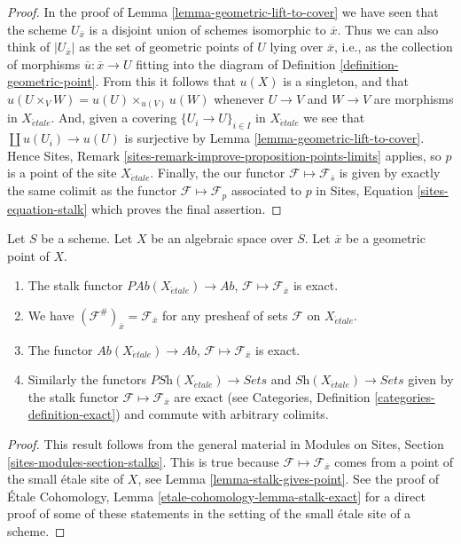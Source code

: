 \begin{proof}
In the proof of
Lemma \ref{lemma-geometric-lift-to-cover}
we have seen that the scheme $U_{\overline{x}}$ is a disjoint union of
schemes isomorphic to $\overline{x}$. Thus we can also think of
$|U_{\overline{x}}|$ as the set of geometric points of $U$ lying over
$\overline{x}$, i.e., as the collection of morphisms
$\overline{u} : \overline{x} \to U$ fitting into the diagram of
Definition \ref{definition-geometric-point}.
From this it follows that $u(X)$ is a singleton, and that
$u(U \times_V W) = u(U) \times_{u(V)} u(W)$
whenever $U \to V$ and $W \to V$ are morphisms in $X_{\acute{e}tale}$.
And, given a covering $\{U_i \to U\}_{i \in I}$ in $X_{\acute{e}tale}$ we see
that $\coprod u(U_i) \to u(U)$ is surjective by
Lemma \ref{lemma-geometric-lift-to-cover}.
Hence
Sites, Remark \ref{sites-remark-improve-proposition-points-limits}
applies, so $p$ is a point of the site $X_{\acute{e}tale}$.
Finally, the our functor $\mathcal{F} \mapsto \mathcal{F}_{\overline{s}}$
is given by exactly the same colimit as the functor
$\mathcal{F} \mapsto \mathcal{F}_p$ associated to $p$ in
Sites, Equation \ref{sites-equation-stalk}
which proves the final assertion.
\end{proof}

\begin{lemma}
\label{lemma-stalk-exact}
Let $S$ be a scheme.
Let $X$ be an algebraic space over $S$.
Let $\overline{x}$ be a geometric point of $X$.
\begin{enumerate}
\item The stalk functor
$\textit{PAb}(X_{\acute{e}tale}) \to \textit{Ab}$,
$\mathcal{F}  \mapsto  \mathcal{F}_{\overline{x}}$
is exact.
\item We have $(\mathcal{F}^\#)_{\overline{x}} = \mathcal{F}_{\overline{x}}$
for any presheaf of sets $\mathcal{F}$ on $X_{\acute{e}tale}$.
\item The functor
$\textit{Ab}(X_{\acute{e}tale}) \to \textit{Ab}$,
$\mathcal{F} \mapsto \mathcal{F}_{\overline{x}}$ is exact.
\item Similarly the functors
$\textit{PSh}(X_{\acute{e}tale}) \to \textit{Sets}$ and
$\textit{Sh}(X_{\acute{e}tale}) \to \textit{Sets}$ given by the stalk functor
$\mathcal{F} \mapsto \mathcal{F}_{\overline{x}}$ are exact (see
Categories, Definition \ref{categories-definition-exact})
and commute with arbitrary colimits.
\end{enumerate}
\end{lemma}

\begin{proof}
This result follows from the general material in
Modules on Sites, Section \ref{sites-modules-section-stalks}.
This is true because $\mathcal{F} \mapsto \mathcal{F}_{\overline{x}}$
comes from a point of the small \'etale site of $X$, see
Lemma \ref{lemma-stalk-gives-point}. See the proof of
\'Etale Cohomology, Lemma \ref{etale-cohomology-lemma-stalk-exact}
for a direct proof of some of these statements in the setting of
the small \'etale site of a scheme.
\end{proof}

